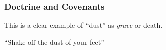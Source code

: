 				
				
		
	
		
		
	\subsubsection{Doctrine and Covenants} %
		\label{DUST-DC}
	
		
		\begin{compactdesc}
			\item[{\hyperref[DC63-51]{DC 63:51}}]
				\begin{compactitem}
					\item This is a clear example of ``dust'' as \textit{grave} or death.
				\end{compactitem}
			\item[{\hyperref[DC75-20]{DC 75:20}}]
				\begin{compactitem}
					\item ``Shake off the dust of your feet''
				\end{compactitem}
		\end{compactdesc}
		
